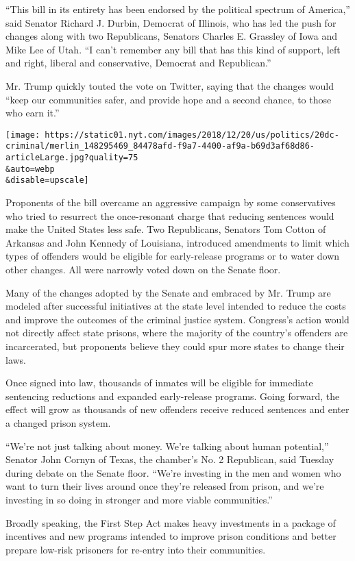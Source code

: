 ``This bill in its entirety has been endorsed by the political spectrum
of America,'' said Senator Richard J. Durbin, Democrat of Illinois, who
has led the push for changes along with two Republicans, Senators
Charles E. Grassley of Iowa and Mike Lee of Utah. ``I can't remember any
bill that has this kind of support, left and right, liberal and
conservative, Democrat and Republican.''

Mr. Trump quickly touted the vote on Twitter, saying that the changes
would ``keep our communities safer, and provide hope and a second
chance, to those who earn it.''

\texttt{[image: https://static01.nyt.com/images/2018/12/20/us/politics/20dc-criminal/merlin\_148295469\_84478afd-f9a7-4400-af9a-b69d3af68d86-articleLarge.jpg?quality=75\\\&auto=webp\\\&disable=upscale]}

Proponents of the bill overcame an aggressive campaign by some
conservatives who tried to resurrect the once-resonant charge that
reducing sentences would make the United States less safe. Two
Republicans, Senators Tom Cotton of Arkansas and John Kennedy of
Louisiana, introduced amendments to limit which types of offenders would
be eligible for early-release programs or to water down other changes.
All were narrowly voted down on the Senate floor.

Many of the changes adopted by the Senate and embraced by Mr. Trump are
modeled after successful initiatives at the state level intended to
reduce the costs and improve the outcomes of the criminal justice
system. Congress's action would not directly affect state prisons, where
the majority of the country's offenders are incarcerated, but proponents
believe they could spur more states to change their laws.

Once signed into law, thousands of inmates will be eligible for
immediate sentencing reductions and expanded early-release programs.
Going forward, the effect will grow as thousands of new offenders
receive reduced sentences and enter a changed prison system.

``We're not just talking about money. We're talking about human
potential,'' Senator John Cornyn of Texas, the chamber's No. 2
Republican, said Tuesday during debate on the Senate floor. ``We're
investing in the men and women who want to turn their lives around once
they're released from prison, and we're investing in so doing in
stronger and more viable communities.''

Broadly speaking, the First Step Act makes heavy investments in a
package of incentives and new programs intended to improve prison
conditions and better prepare low-risk prisoners for re-entry into their
communities.

